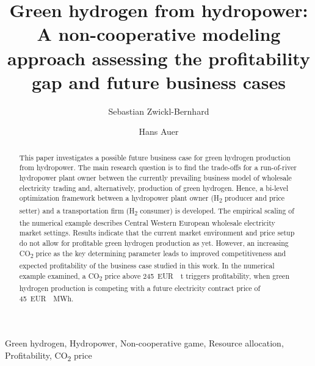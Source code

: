 \documentclass[review]{elsarticle}
\begin{document}
\begin{frontmatter}

\title{Green hydrogen from hydropower: A non-cooperative modeling approach assessing the profitability gap and future business cases}
\author[1]{Sebastian Zwickl-Bernhard}
\author[1]{Hans Auer}
\address[1]{Energy Economics Group (EEG), Technische Universität Wien, Gusshausstrasse 25-29/E370-3, 1040 Wien, Austria}


\begin{abstract}
This paper investigates a possible future business case for green hydrogen production from hydropower. The main research question is to find the trade-offs for a run-of-river hydropower plant owner between the currently prevailing business model of wholesale electricity trading and, alternatively, production of green hydrogen. Hence, a bi-level optimization framework between a hydropower plant owner (H\textsubscript{2} producer and price setter) and a transportation firm (H\textsubscript{2} consumer) is developed. The empirical scaling of the numerical example describes Central Western European wholesale electricity market settings. Results indicate that the current market environment and price setup do not allow for profitable green hydrogen production as yet. However, an increasing CO\textsubscript{2} price as the key determining parameter leads to improved competitiveness and expected profitability of the business case studied in this work. In the numerical example examined, a CO\textsubscript{2} price above \SI{245}{EUR \per \tonne} triggers profitability, when green hydrogen production is competing with a future electricity contract price of \SI{45}{EUR \per MWh}.
\end{abstract}


\begin{keyword}
Green hydrogen, Hydropower, Non-cooperative game, Resource allocation, Profitability, CO\textsubscript{2} price
\end{keyword}

\end{frontmatter}
\newpage
\end{document}
